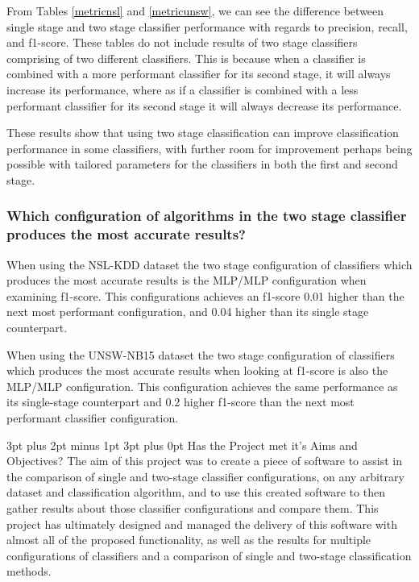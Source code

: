 \documentclass[12pt,a4paper]{article}
\makeatletter
\renewcommand\subsection{\@startsection {subsection}{1}{2mm} %
      {3pt plus 2pt minus 1pt} %
      {3pt plus 0pt} %
      {\normalfont\bfseries}}
\makeatother
\begin{document}
From Tables \ref{metricnsl} and \ref{metricunsw}, we can see the difference between single stage and two stage classifier performance with regards to precision, recall, and f1-score. These tables do not include results of two stage classifiers comprising of two different classifiers. This is because when a classifier is combined with a more performant classifier for its second stage, it will always increase its performance, where as if a classifier is combined with a less performant classifier for its second stage it will always decrease its performance.

These results show that using two stage classification can improve classification performance in some classifiers, with further room for improvement perhaps being possible with tailored parameters for the classifiers in both the first and second stage.

\subsubsection*{Which configuration of algorithms in the two stage classifier produces the most accurate results?}

When using the NSL-KDD dataset the two stage configuration of classifiers which produces the most accurate results is the MLP/MLP configuration when examining f1-score. This configurations achieves an f1-score 0.01 higher than the next most performant configuration, and 0.04 higher than its single stage counterpart.

When using the UNSW-NB15 dataset the two stage configuration of classifiers which produces the most accurate results when looking at f1-score is also the MLP/MLP configuration. This configuration achieves the same performance as its single-stage counterpart and 0.2 higher f1-score than the next most performant classifier configuration.

\subsection{Has the Project met it's Aims and Objectives?}
The aim of this project was to create a piece of software to assist in the comparison of single and two-stage classifier configurations, on any arbitrary dataset and classification algorithm, and to use this created software to then gather results about those classifier configurations and compare them. This project has ultimately designed and managed the delivery of this software with almost all of the proposed functionality, as well as the results for multiple configurations of classifiers and a comparison of single and two-stage classification methods.
\end{document}
